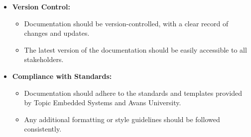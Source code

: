 \documentclass{article}
\begin{document}
\begin{itemize}[leftmargin=*, label={}]
    \item \textbf{Version Control:}
        \begin{itemize}
            \item Documentation should be version-controlled, with a clear record of changes and updates.
            \item The latest version of the documentation should be easily accessible to all stakeholders.
        \end{itemize}
    \item \textbf{Compliance with Standards:}
        \begin{itemize}
            \item Documentation should adhere to the standards and templates provided by Topic Embedded Systems and Avans University.
            \item Any additional formatting or style guidelines should be followed consistently.
        \end{itemize}
\end{itemize}
\end{document}
